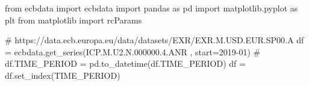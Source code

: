 \documentclass[
  11pt,
]{article}
\newenvironment{Shaded}{\begin{snugshade}}{\end{snugshade}}
\newcommand{\CommentTok}[1]{\textcolor[rgb]{0.37,0.37,0.37}{#1}}
\newcommand{\ImportTok}[1]{\textcolor[rgb]{0.00,0.46,0.62}{#1}}
\newcommand{\NormalTok}[1]{\textcolor[rgb]{0.00,0.23,0.31}{#1}}
\newcommand{\OperatorTok}[1]{\textcolor[rgb]{0.37,0.37,0.37}{#1}}
\newcommand{\StringTok}[1]{\textcolor[rgb]{0.13,0.47,0.30}{#1}}
\begin{document}
\begin{Shaded}
\begin{Highlighting}[]
\ImportTok{from}\NormalTok{ ecbdata }\ImportTok{import}\NormalTok{ ecbdata}
\ImportTok{import}\NormalTok{ pandas }\ImportTok{as}\NormalTok{ pd}
\ImportTok{import}\NormalTok{ matplotlib.pyplot }\ImportTok{as}\NormalTok{ plt}
\ImportTok{from}\NormalTok{ matplotlib }\ImportTok{import}\NormalTok{ rcParams}

\CommentTok{\# https://data.ecb.europa.eu/data/datasets/EXR/EXR.M.USD.EUR.SP00.A}
\NormalTok{df }\OperatorTok{=}\NormalTok{ ecbdata.get\_series(}\StringTok{\textquotesingle{}ICP.M.U2.N.000000.4.ANR\textquotesingle{}}\NormalTok{ , start}\OperatorTok{=}\StringTok{\textquotesingle{}2019{-}01\textquotesingle{}}\NormalTok{) }\CommentTok{\#}
\NormalTok{df.TIME\_PERIOD }\OperatorTok{=}\NormalTok{ pd.to\_datetime(df.TIME\_PERIOD)}
\NormalTok{df }\OperatorTok{=}\NormalTok{ df.set\_index(}\StringTok{\textquotesingle{}TIME\_PERIOD\textquotesingle{}}\NormalTok{)}
\end{Highlighting}
\end{Shaded}
\end{document}
